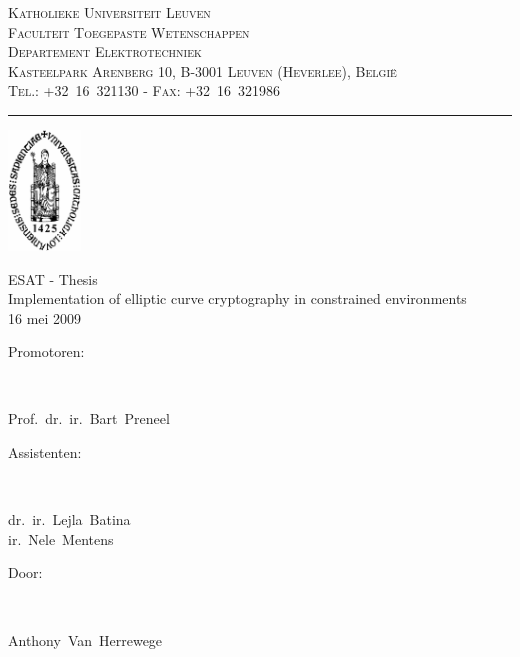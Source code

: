 \documentclass[a4paper]{article}    %
\newcommand{\vak}{ESAT - Thesis}
\newcommand{\opgave}{Implementation of elliptic curve cryptography in constrained environments}
\newcommand{\titel}{{\LARGE \vak}\\[2mm]
{\Large \opgave}}
\newcommand{\datum}{16 mei 2009}
\newcommand{\departement}{Departement Elektrotechniek}
\newcommand{\depadres}{Kasteelpark Arenberg 10, B-3001 Leuven (Heverlee), Belgi\"e}
\newcommand{\depcontact}{Tel.: +32~16~321130 - Fax: +32~16~321986}
\newcommand{\professoren}{Prof.~dr.~ir.~Bart~Preneel}
\newcommand{\assistenten}{dr.~ir.~Lejla~Batina\\ir.~Nele~Mentens}
\newcommand{\student}{Anthony~Van~Herrewege}
\begin{document}
\thispagestyle{empty}

\begin{minipage}[c]{100mm}
\small
\textsc{Katholieke Universiteit Leuven\\
Faculteit Toegepaste Wetenschappen\\
\departement\\[3mm]
\depadres\\
\depcontact}
\end{minipage}
\hfill
\begin{minipage}{45mm}
\parbox[b]{15mm}{\rule{1pt}{32mm}}
\includegraphics[height=32mm,bb=0 0 309 520]{voorblad-sedes}
\end{minipage}


\begin{center}
\parbox[c]{0.7\textwidth}{
    \centering
    \textsf{\titel\\[6mm]
            {\small \datum}}
}
\end{center}


\begin{minipage}{60mm}
\textsf{{\large Promotoren:\\}}
\parbox[t]{3mm}{~}
\parbox[t]{70mm}{\textsf{\professoren}\\[3mm]}
\textsf{{\large Assistenten:}}\\
\parbox[t]{3mm}{~}
\parbox[t]{50mm}{\textsf{\assistenten}}
\end{minipage}
\hfill
\begin{minipage}{50mm}
\textsf{{\large Door:\\}}
\parbox[t]{3mm}{~}
\parbox[t]{60mm}{\textsf{\student}}
\end{minipage}
\end{document}
